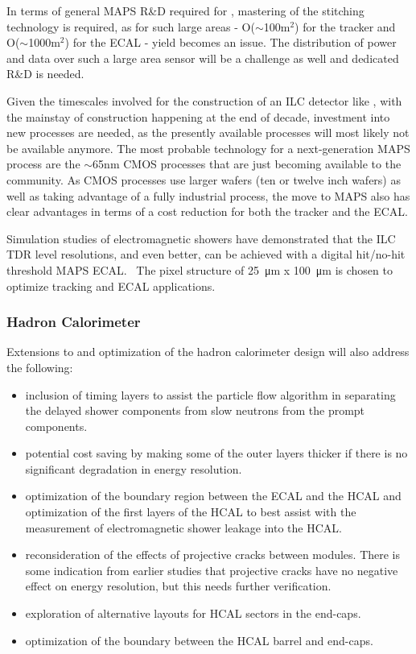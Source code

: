 In terms of general MAPS R\&D required for \sid, mastering of the stitching technology is required, 
as for such large areas - O($\sim${100}{m$^2$}) for the 
tracker and  O($\sim${1000}{m$^2$}) for the ECAL - yield becomes an issue. The distribution of power and data over such a large area sensor will be a challenge 
as well and dedicated R\&D is needed.

Given the timescales involved for the construction of an ILC detector like \sid , with the mainstay of construction happening at the end of decade, 
investment into new processes are needed, as the presently available processes will most likely not be available anymore. The most probable technology 
for a next-generation MAPS process are the $\sim${65}{nm} CMOS processes that are just becoming available to the community. As CMOS processes use larger wafers 
(ten or twelve inch wafers) as well as taking advantage of a fully industrial process, the move to MAPS also has clear advantages in terms of a cost reduction for both the 
tracker and the ECAL.

Simulation studies of electromagnetic showers have demonstrated that the ILC TDR level resolutions, and even better, can be achieved with a digital hit/no-hit threshold MAPS ECAL.~\cite{Brau:2021} The pixel structure of \SI{25}{\micro\meter} x \SI{100}{\micro\meter} is chosen to optimize tracking and ECAL applications.

\subsubsection{Hadron Calorimeter}
Extensions to and optimization of the hadron calorimeter design will also address the following:
 \begin{itemize}
\item inclusion of timing layers to assist the particle flow algorithm in separating the delayed shower components from slow neutrons from the prompt components.
 
\item potential cost saving by making some of the outer layers thicker if there is no significant degradation in energy resolution.

\item optimization of the boundary region between the ECAL and the HCAL and optimization of the first layers of the HCAL to best assist with the measurement of electromagnetic shower leakage into the HCAL.

\item reconsideration of the effects of projective cracks between modules. There is some indication from earlier studies that projective cracks have no negative effect on energy resolution, but this needs further verification.

\item exploration of alternative layouts for HCAL sectors in the end-caps.

\item optimization of the boundary between the HCAL barrel and end-caps.

\end{itemize}

